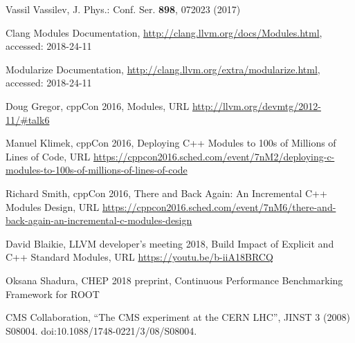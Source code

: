 \documentclass{webofc}
\begin{document}
\begin{thebibliography}{plain}

Vassil Vassilev, J. Phys.: Conf. Ser. \textbf{898}, 072023 (2017)

Clang Modules Documentation, \url{http://clang.llvm.org/docs/Modules.html}, accessed: 2018-24-11

Modularize Documentation, \url{http://clang.llvm.org/extra/modularize.html}, accessed: 2018-24-11

Doug Gregor, cppCon 2016, Modules, URL \url{http://llvm.org/devmtg/2012-11/#talk6}

Manuel Klimek, cppCon 2016, Deploying C++ Modules to 100s of Millions of Lines of Code, URL \url{https://cppcon2016.sched.com/event/7nM2/deploying-c-modules-to-100s-of-millions-of-lines-of-code}

Richard Smith, cppCon 2016, There and Back Again: An Incremental C++ Modules Design, URL \url{https://cppcon2016.sched.com/event/7nM6/there-and-back-again-an-incremental-c-modules-design}

David Blaikie, LLVM developer's meeting 2018, Build Impact of Explicit and C++ Standard Modules, URL \url{https://youtu.be/b-iiA18BRCQ}

Oksana Shadura, CHEP 2018 preprint, Continuous Performance Benchmarking Framework for ROOT

CMS Collaboration, “The CMS experiment at the CERN LHC”, JINST 3 (2008) S08004. doi:10.1088/1748-0221/3/08/S08004.

\end{thebibliography}
\end{document}
